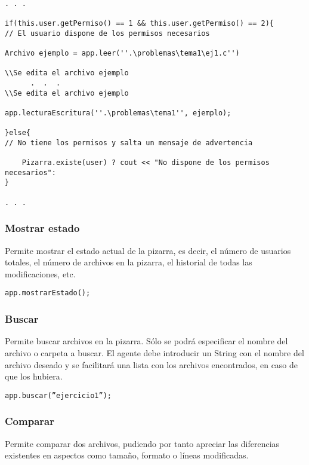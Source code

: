 \begin{lstlisting}

. . .

if(this.user.getPermiso() == 1 && this.user.getPermiso() == 2){ 
// El usuario dispone de los permisos necesarios

Archivo ejemplo = app.leer(''.\problemas\tema1\ej1.c'') 

\\Se edita el archivo ejemplo
      .  .  .
\\Se edita el archivo ejemplo

app.lecturaEscritura(''.\problemas\tema1'', ejemplo);

}else{            
// No tiene los permisos y salta un mensaje de advertencia

    Pizarra.existe(user) ? cout << "No dispone de los permisos necesarios":
}

. . .
\end{lstlisting}
 
\subsubsection{Mostrar estado}
Permite mostrar el estado actual de la pizarra, es decir, el número de usuarios totales, el número de archivos en la pizarra, el historial de todas las modificaciones, etc.

\begin{center}
\texttt{app.mostrarEstado();}
\end{center}

\subsubsection{Buscar}
Permite buscar archivos en la pizarra. Sólo se podrá especificar el nombre del archivo o carpeta a buscar. El agente debe introducir un String con el nombre del archivo deseado y se facilitará una lista con los archivos encontrados, en caso de que los hubiera.

\begin{center}
\texttt{app.buscar(''ejercicio1'');}
\end{center}


\subsubsection{Comparar}
Permite comparar dos archivos, pudiendo por tanto apreciar las diferencias existentes en aspectos como tamaño, formato o líneas modificadas.\\

